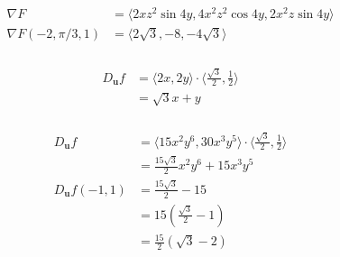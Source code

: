 \documentclass{article}
\begin{document}
\begin{align*}
  \nabla F                 & = \langle 2 x z^2 \sin 4 y, 4 x^2 z^2 \cos 4 y, 2 x^2 z \sin 4 y \rangle \\
  \nabla F(-2, \pi / 3, 1) & = \langle 2 \sqrt{3}, -8, -4 \sqrt{3} \rangle
\end{align*}

\setcounter{subsubsection}{8}
\subsubsection{}

\begin{align*}
  D_\mathbf{u} f & = \langle 2 x, 2 y \rangle \cdot \langle \frac{\sqrt{3}}{2}, \frac{1}{2} \rangle \\
                 & = \sqrt{3} x + y
\end{align*}

\setcounter{subsubsection}{10}
\subsubsection{}

\begin{align*}
  D_\mathbf{u} f        & = \langle 15 x^2 y^6, 30 x^3 y^5 \rangle \cdot \langle \frac{\sqrt{3}}{2}, \frac{1}{2} \rangle \\
                        & = \frac{15 \sqrt{3}}{2} x^2 y^6 + 15 x^3 y^5                                                   \\
  D_\mathbf{u} f(-1, 1) & = \frac{15 \sqrt{3}}{2} - 15                                                                   \\
                        & = 15 \left( \frac{\sqrt{3}}{2} - 1 \right)                                                     \\
                        & = \frac{15}{2} (\sqrt{3} - 2)
\end{align*}

\setcounter{subsubsection}{20}
\subsubsection{}
\end{document}
